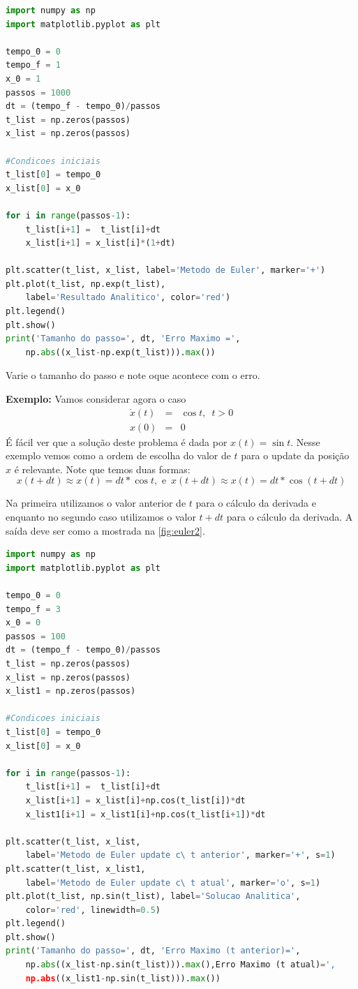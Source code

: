 \begin{lstlisting}[language = Python]
import numpy as np
import matplotlib.pyplot as plt

tempo_0 = 0
tempo_f = 1
x_0 = 1
passos = 1000
dt = (tempo_f - tempo_0)/passos
t_list = np.zeros(passos)
x_list = np.zeros(passos)

#Condicoes iniciais
t_list[0] = tempo_0
x_list[0] = x_0

for i in range(passos-1):
    t_list[i+1] =  t_list[i]+dt
    x_list[i+1] = x_list[i]*(1+dt)

plt.scatter(t_list, x_list, label='Metodo de Euler', marker='+')
plt.plot(t_list, np.exp(t_list), 
    label='Resultado Analitico', color='red')
plt.legend()
plt.show()
print('Tamanho do passo=', dt, 'Erro Maximo =', 
    np.abs((x_list-np.exp(t_list))).max())
\end{lstlisting}

Varie o tamanho do passo e note oque acontece com o erro.

{\bf Exemplo:} Vamos considerar agora o caso
\[\begin{array}{rcl}
\dot x(t) & = & \cos t,\,\,\, t>0\\
x(0) & = & 0
\end{array}\]
É fácil ver que a solução deste problema é dada por $x(t) = \sin t$. Nesse exemplo vemos como a ordem de escolha do valor de $t$ para o update da posição $x$ é relevante. Note que temos duas formas:
\[ x(t+dt) \approx x(t) = dt*\cos t,\,\, \textrm{e} \,\,\,x(t+dt) \approx x(t) = dt*\cos (t+dt)\]

Na primeira utilizamos o valor anterior de $t$ para o cálculo da derivada e enquanto no segundo caso utilizamos o valor $t+dt$ para o cálculo da derivada. A saída deve ser como a mostrada na \ref{fig:euler2}.


\begin{lstlisting}[language = Python]
import numpy as np
import matplotlib.pyplot as plt

tempo_0 = 0
tempo_f = 3
x_0 = 0
passos = 100
dt = (tempo_f - tempo_0)/passos
t_list = np.zeros(passos)
x_list = np.zeros(passos)
x_list1 = np.zeros(passos)

#Condicoes iniciais
t_list[0] = tempo_0
x_list[0] = x_0

for i in range(passos-1):
    t_list[i+1] =  t_list[i]+dt
    x_list[i+1] = x_list[i]+np.cos(t_list[i])*dt
    x_list1[i+1] = x_list1[i]+np.cos(t_list[i+1])*dt

plt.scatter(t_list, x_list, 
    label='Metodo de Euler update c\ t anterior', marker='+', s=1)
plt.scatter(t_list, x_list1,
    label='Metodo de Euler update c\ t atual', marker='o', s=1)
plt.plot(t_list, np.sin(t_list), label='Solucao Analitica',
    color='red', linewidth=0.5)
plt.legend()
plt.show()
print('Tamanho do passo=', dt, 'Erro Maximo (t anterior)=',
    np.abs((x_list-np.sin(t_list))).max(),Erro Maximo (t atual)=',
    np.abs((x_list1-np.sin(t_list))).max())
\end{lstlisting}




